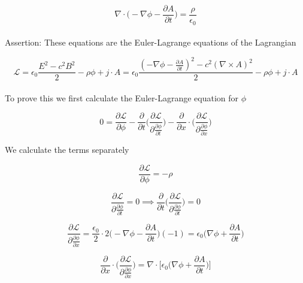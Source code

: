 \documentclass{article}
\begin{document}
\begin{equation} \label{MaxwellAPhi2}
\nabla \cdot \bigg( -\nabla \phi - \frac{\partial A}{\partial t} \bigg) = \frac{\rho}{\epsilon_0} 
\end{equation}
\\

Assertion: These equations are the Euler-Lagrange equations of the Lagrangian

\begin{equation}
\mathcal{L} = \epsilon_0 \frac{E^2 - c^2 B^2}{2} - \rho\phi + j \cdot A
= \epsilon_0 \frac{(-\nabla\phi - \frac{\partial A}{\partial t})^2 - c^2 (\nabla \times A)^2}{2} - \rho\phi + j \cdot A
\end{equation}
\\

To prove this we first calculate the Euler-Lagrange equation for $\phi$

\begin{equation} \label{ELPhi}
0 = \frac{\partial \mathcal{L}}{\partial \phi}
-\frac{\partial}{\partial t} \bigg( \frac{\partial \mathcal{L}}{\partial \frac{\partial \phi}{\partial t}} \bigg) 
-\frac{\partial}{\partial x} \cdot \bigg( \frac{\partial \mathcal{L}}{\partial \frac{\partial \phi}{\partial x}} \bigg) 
\end{equation}

We calculate the terms separately

\begin{equation}
\frac{\partial \mathcal{L}}{\partial \phi} = -\rho
\end{equation}

\begin{equation}
\frac{\partial \mathcal{L}}{\partial \frac{\partial \phi}{\partial t}} = 0 
\implies \frac{\partial}{\partial t} \bigg( \frac{\partial \mathcal{L}}{\partial \frac{\partial \phi}{\partial t}}\bigg) = 0 
\end{equation}



\begin{equation}
\frac{\partial \mathcal{L}}{\partial \frac{\partial \phi}{\partial x}} 
= \frac{\epsilon_0}{2} \cdot 2 \bigg(-\nabla \phi - \frac{\partial A}{\partial t} \bigg) (-1) 
= \epsilon_0 \bigg(\nabla \phi + \frac{\partial A}{\partial t} \bigg)
\end{equation}

\begin{equation}
\frac{\partial}{\partial x} \cdot \bigg(\frac{\partial \mathcal{L}}{\partial \frac{\partial \phi}{\partial x}} \bigg) 
= \nabla \cdot \bigg[\epsilon_0 \bigg(\nabla \phi + \frac{\partial A}{\partial t} \bigg)\bigg]
\end{equation}
\end{document}
